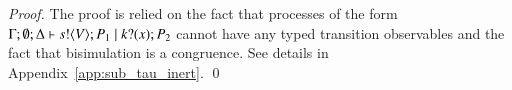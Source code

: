 \begin{proof}
	The proof is relied on the fact that processes of the
	form $\Gamma; \emptyset; \Delta \vdash s ! \langle V \rangle ; P_1 \;|\; k ? (x) ; P_2$
	cannot have any typed transition observables and the fact
	that bisimulation is a congruence.
	See details in Appendix~\ref{app:sub_tau_inert}.
	\qed
\end{proof}



